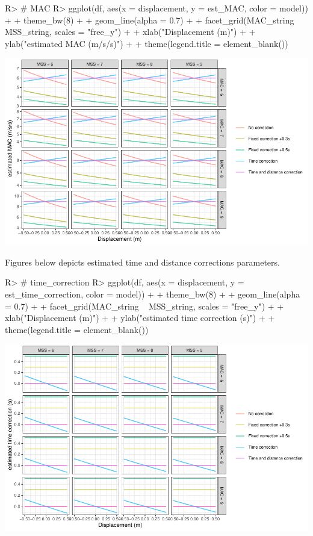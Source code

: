 \documentclass[
]{jss}
\begin{document}
\begin{CodeChunk}
\begin{CodeInput}
R> # MAC
R> ggplot(df, aes(x = displacement, y = est_MAC, color = model)) +
+   theme_bw(8) +
+   geom_line(alpha = 0.7) +
+   facet_grid(MAC_string ~ MSS_string, scales = "free_y") +
+   xlab("Displacement (m)") +
+   ylab("estimated MAC (m/s/s)") +
+   theme(legend.title = element_blank())
\end{CodeInput}


\begin{center}\includegraphics[width=1\linewidth]{paper_files/figure-latex/unnamed-chunk-51-1} \end{center}

\end{CodeChunk}

Figures below depicts estimated time and distance corrections parameters.

\begin{CodeChunk}
\begin{CodeInput}
R> # time_correction
R> ggplot(df, aes(x = displacement, y = est_time_correction, color = model)) +
+   theme_bw(8) +
+   geom_line(alpha = 0.7) +
+   facet_grid(MAC_string ~ MSS_string, scales = "free_y") +
+   xlab("Displacement (m)") +
+   ylab("estimated time correction (s)") +
+   theme(legend.title = element_blank())
\end{CodeInput}


\begin{center}\includegraphics[width=1\linewidth]{paper_files/figure-latex/unnamed-chunk-52-1} \end{center}

\end{CodeChunk}
\end{document}
